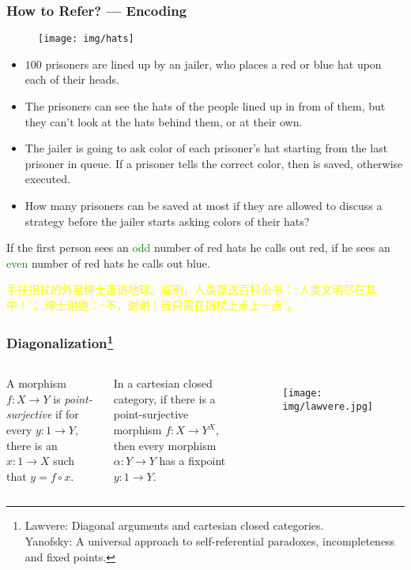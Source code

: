 \documentclass[UTF8,11pt,colorlinks,compress,openany]{beamer}%
\begin{document}
\begin{frame}\frametitle{How to Refer? --- Encoding}
	\begin{figure}
		\texttt{[image: img/hats]}
	\end{figure}
	\begin{itemize}
		\item $100$ prisoners are lined up by an jailer, who places a red or blue hat upon each of their heads.
		\item The prisoners can see the hats of the people lined up in from of them, but they can't look at the hats behind them, or at their own.
		\item The jailer is going to ask color of each prisoner's hat starting from the last prisoner in queue. If a prisoner tells the correct color, then is saved, otherwise executed.
		\item How many prisoners can be saved at most if they are allowed to discuss a strategy before the jailer starts asking colors of their hats?
	\end{itemize}
	\begin{block}{} 
		If the first person sees an \textcolor{green}{odd} number of red hats he calls out red, if he sees an \textcolor{green}{even} number of red hats he calls out blue.
	\end{block}
\begin{block}{}
\small \textcolor{yellow}{手扶拐杖的外星绅士造访地球。临别，人类赠送百科全书：“人类文明尽在其中！”。绅士谢绝：“不，谢谢！我只需在拐杖上点上一点”。}
\end{block}
\end{frame}

\begin{frame}\frametitle{Diagonalization\footnote{\tiny Lawvere: Diagonal arguments and cartesian closed categories.\\
Yanofsky: A universal approach to self-referential paradoxes, incompleteness and fixed points.}}
\setlength\abovedisplayskip{0pt}
\setlength\belowdisplayskip{0pt}
\begin{columns}
\begin{definition}
A morphism $f: X\to Y$ is \emph{point-surjective} if for every $y: 1\to Y$, there is an $x: 1\to X$ such that $y=f\circ x$.
\end{definition}
	\begin{theorem}
		In a cartesian closed category, if there is a point-surjective morphism $f: X\to Y^X$, then every morphism $\alpha: Y\to Y$ has a fixpoint $y: 1\to Y$.
	\end{theorem}
	\begin{figure}
		\texttt{[image: img/lawvere.jpg]}
	\end{figure}
\end{columns}
\end{frame}
\end{document}
